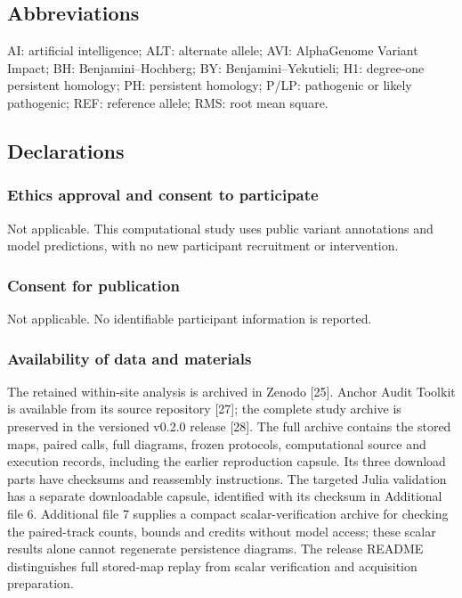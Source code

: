 \documentclass[
  11pt,
]{article}
\begin{document}
\subsection{Abbreviations}\label{abbreviations}

AI: artificial intelligence; ALT: alternate allele; AVI: AlphaGenome
Variant Impact; BH: Benjamini--Hochberg; BY: Benjamini--Yekutieli; H1:
degree-one persistent homology; PH: persistent homology; P/LP:
pathogenic or likely pathogenic; REF: reference allele; RMS: root mean
square.

\subsection{Declarations}\label{declarations}

\subsubsection{Ethics approval and consent to
participate}\label{ethics-approval-and-consent-to-participate}

Not applicable. This computational study uses public variant annotations
and model predictions, with no new participant recruitment or
intervention.

\subsubsection{Consent for publication}\label{consent-for-publication}

Not applicable. No identifiable participant information is reported.

\subsubsection{Availability of data and
materials}\label{availability-of-data-and-materials}

The retained within-site analysis is archived in Zenodo {[}25{]}. Anchor
Audit Toolkit is available from its source repository {[}27{]}; the
complete study archive is preserved in the versioned v0.2.0 release
{[}28{]}. The full archive contains the stored maps, paired calls, full
diagrams, frozen protocols, computational source and execution records,
including the earlier reproduction capsule. Its three download parts
have checksums and reassembly instructions. The targeted Julia
validation has a separate downloadable capsule, identified with its
checksum in Additional file 6. Additional file 7 supplies a compact
scalar-verification archive for checking the paired-track counts, bounds
and credits without model access; these scalar results alone cannot
regenerate persistence diagrams. The release README distinguishes full
stored-map replay from scalar verification and acquisition preparation.
\end{document}
